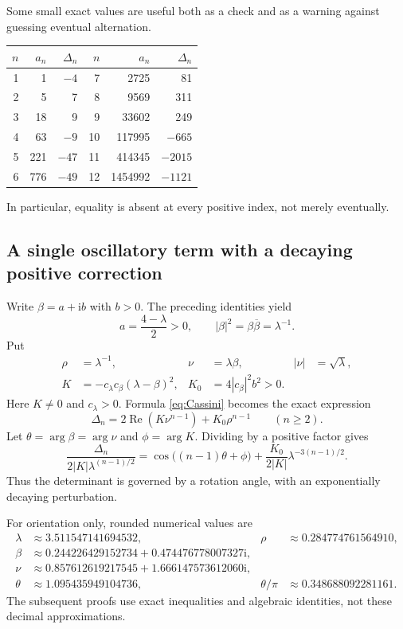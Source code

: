 \documentclass[11pt,letterpaper]{article}
\theoremstyle{definition}
\newcommand{\Delt}{\Delta}
\newcommand{\ii}{\mathrm i}
\DeclareMathOperator{\Rea}{Re}
\numberwithin{equation}{section}
\begin{document}
Some small exact values are useful both as a check and as a warning
against guessing eventual alternation.
\begin{center}
\begin{tabular}{rrrrrr}
\toprule
$n$ & $a_n$ & $\Delt_n$ & $n$ & $a_n$ & $\Delt_n$\\
\midrule
1&1&$-4$&7&2725&81\\
2&5&7&8&9569&311\\
3&18&9&9&33602&249\\
4&63&$-9$&10&117995&$-665$\\
5&221&$-47$&11&414345&$-2015$\\
6&776&$-49$&12&1454992&$-1121$\\
\bottomrule
\end{tabular}
\end{center}
In particular, equality is absent at every positive index, not merely
eventually.

\subsection{A single oscillatory term with a decaying positive correction}

Write $\beta=a+\ii b$ with $b>0$. The preceding identities yield
\begin{equation}\label{eq:beta-properties}
a=\frac{4-\lambda}{2}>0,\qquad
|\beta|^2=\beta\overline\beta=\lambda^{-1}.
\end{equation}
Put
\begin{align}
\rho&=\lambda^{-1},&\nu&=\lambda\beta,&|\nu|&=\sqrt\lambda,\label{eq:nu}\\
K&=-c_\lambda c_\beta(\lambda-\beta)^2,&
K_0&=4|c_\beta|^2b^2>0.\label{eq:Ks}
\end{align}
Here $K\ne0$ and $c_\lambda>0$.
Formula \eqref{eq:Cassini} becomes the exact expression
\begin{equation}\label{eq:delta-exact}
\Delt_n=2\Rea(K\nu^{n-1})+K_0\rho^{n-1}\qquad(n\ge2).
\end{equation}
Let $\theta=\arg\beta=\arg\nu$ and $\phi=\arg K$. Dividing by a
positive factor gives
\begin{equation}\label{eq:cosine}
\frac{\Delt_n}{2|K|\lambda^{(n-1)/2}}
=\cos\bigl((n-1)\theta+\phi\bigr)
 +\frac{K_0}{2|K|}\lambda^{-3(n-1)/2}.
\end{equation}
Thus the determinant is governed by a rotation angle, with an
exponentially decaying perturbation.

For orientation only, rounded numerical values are
\begin{align*}
\lambda&\approx3.511547141694532,&\rho&\approx0.284774761564910,\\
\beta&\approx0.244226429152734+0.474476778007327\ii,\\
\nu&\approx0.857612619217545+1.666147573612060\ii,\\
\theta&\approx1.095435949104736,&\theta/\pi&\approx0.348688092281161.
\end{align*}
The subsequent proofs use exact inequalities and algebraic identities,
not these decimal approximations.
\end{document}
